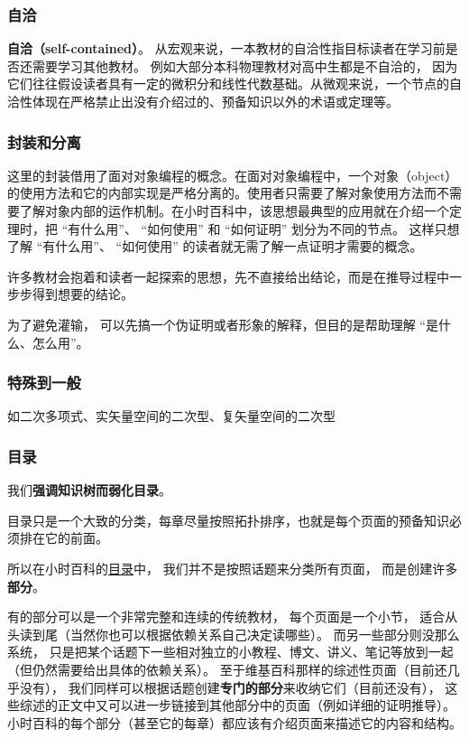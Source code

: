\subsubsection{自洽}
\textbf{自洽（self-contained）}。 从宏观来说，一本教材的自洽性指目标读者在学习前是否还需要学习其他教材。 例如大部分本科物理教材对高中生都是不自洽的， 因为它们往往假设读者具有一定的微积分和线性代数基础。从微观来说，一个节点的自洽性体现在严格禁止出没有介绍过的、预备知识以外的术语或定理等。

\subsubsection{封装和分离}
这里的封装借用了面对对象编程的概念。在面对对象编程中，一个对象（object）的使用方法和它的内部实现是严格分离的。使用者只需要了解对象使用方法而不需要了解对象内部的运作机制。在小时百科中，该思想最典型的应用就在介绍一个定理时，把 “有什么用”、 “如何使用” 和 “如何证明” 划分为不同的节点。 这样只想了解 “有什么用”、 “如何使用” 的读者就无需了解一点证明才需要的概念。

许多教材会抱着和读者一起探索的思想，先不直接给出结论，而是在推导过程中一步步得到想要的结论。

为了避免灌输， 可以先搞一个伪证明或者形象的解释，但目的是帮助理解 “是什么、怎么用”。

\subsubsection{特殊到一般}
如二次多项式、实矢量空间的二次型、复矢量空间的二次型

\subsubsection{目录}
我们\textbf{强调知识树而弱化目录}。 

目录只是一个大致的分类，每章尽量按照拓扑排序，也就是每个页面的预备知识必须排在它的前面。

所以在小时百科的\href{http://wuli.wiki/online}{目录}中， 我们并不是按照话题来分类所有页面， 而是创建许多\textbf{部分}。

有的部分可以是一个非常完整和连续的传统教材， 每个页面是一个小节， 适合从头读到尾（当然你也可以根据依赖关系自己决定读哪些）。 而另一些部分则没那么系统， 只是把某个话题下一些相对独立的小教程、博文、讲义、笔记等放到一起（但仍然需要给出具体的依赖关系）。 至于维基百科那样的综述性页面（目前还几乎没有）， 我们同样可以根据话题创建\textbf{专门的部分}来收纳它们（目前还没有）， 这些综述的正文中又可以进一步链接到其他部分中的页面（例如详细的证明推导）。 小时百科的每个部分（甚至它的每章）都应该有介绍页面来描述它的内容和结构。


